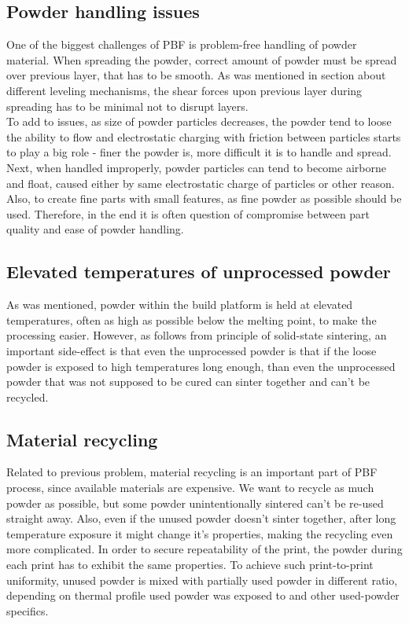 \documentclass[a4paper, twoside, 11pt]{report}
\begin{document}
\subsection{Powder handling issues}
One of the biggest challenges of PBF is problem-free handling of powder material. When spreading the powder, correct amount of powder must be spread over previous layer, that has to be smooth. As was mentioned in section about different leveling mechanisms, the shear forces upon previous layer during spreading has to be minimal not to disrupt layers.\\
	To add to issues, as size of powder particles decreases, the powder tend to loose the ability to flow and electrostatic charging with friction between particles starts to play a big role - finer the powder is, more difficult it is to handle and spread. Next, when handled improperly, powder particles can tend to become airborne and float, caused either by same electrostatic charge of particles or other reason. Also, to create fine parts with small features, as fine powder as possible should be used. Therefore, in the end it is often question of compromise between part quality and ease of powder handling.
\subsection{Elevated temperatures of unprocessed powder}
As was mentioned, powder within the build platform is held at elevated temperatures, often as high as possible below the melting point, to make the processing easier. However, as follows from principle of solid-state sintering, an important side-effect is that even the unprocessed powder is that if the loose powder is exposed to high temperatures long enough, than even the unprocessed powder that was not supposed to be cured can sinter together and can't be recycled.
\subsection{Material recycling}
Related to previous problem, material recycling is an important part of PBF process, since available materials are expensive. We want to recycle as much powder as possible, but some powder unintentionally sintered can't be re-used straight away. Also, even if the unused powder doesn't sinter together, after long temperature exposure it might change it's properties, making the recycling even more complicated. In order to secure repeatability of the print, the powder during each print has to exhibit the same properties. To achieve such print-to-print uniformity, unused powder is mixed with partially used powder in different ratio, depending on thermal profile used powder was exposed to and other used-powder specifics.
\end{document}
